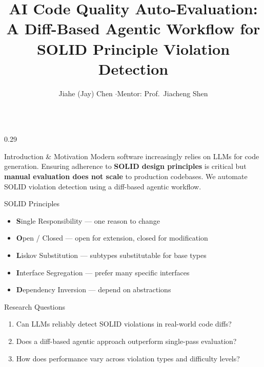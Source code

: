 \documentclass[10pt,final]{beamer}
\title{AI Code Quality Auto-Evaluation: A Diff-Based Agentic Workflow for SOLID Principle Violation Detection}
\author{Jiahe (Jay) Chen \enspace$\cdot$\enspace Mentor: Prof.\ Jiacheng Shen}
\institute{Duke Kunshan University \enspace$\cdot$\enspace Division of Natural and Applied Sciences \enspace$\cdot$\enspace Class of 2026}
\begin{document}
\begin{frame}[t]
  \vspace{1.0cm}

  \begin{columns}[T]
    \hspace{1.2cm}

    \begin{column}{0.29\paperwidth}

      \begin{block}{Introduction \& Motivation}
        Modern software increasingly relies on LLMs for code generation.
        Ensuring adherence to \textbf{SOLID design principles} is critical
        but \textbf{manual evaluation does not scale} to production codebases.
        We automate SOLID violation detection using a diff-based agentic workflow.
      \end{block}

      \begin{block}{SOLID Principles}
        \begin{itemize}
          \item \textbf{S}ingle Responsibility --- one reason to change
          \item \textbf{O}pen / Closed --- open for extension, closed for modification
          \item \textbf{L}iskov Substitution --- subtypes substitutable for base types
          \item \textbf{I}nterface Segregation --- prefer many specific interfaces
          \item \textbf{D}ependency Inversion --- depend on abstractions
        \end{itemize}
      \end{block}

      \begin{block}{Research Questions}
        \begin{enumerate}
          \item Can LLMs reliably detect SOLID violations in real-world code diffs?
          \item Does a diff-based agentic approach outperform single-pass evaluation?
          \item How does performance vary across violation types and difficulty levels?
        \end{enumerate}
      \end{block}


\end{column}
\end{columns}
\end{frame}
\end{document}
